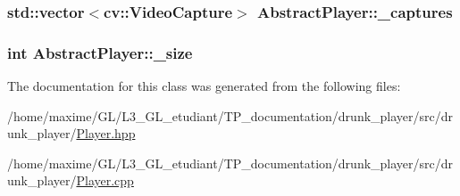 \subsubsection[{\texorpdfstring{\+\_\+captures}{_captures}}]{\setlength{\rightskip}{0pt plus 5cm}std\+::vector$<$cv\+::\+Video\+Capture$>$ Abstract\+Player\+::\+\_\+captures\hspace{0.3cm}{\ttfamily [protected]}}\hypertarget{classAbstractPlayer_a72dd2ef25310decd45671a7d51e1f319}{}\label{classAbstractPlayer_a72dd2ef25310decd45671a7d51e1f319}
\subsubsection[{\texorpdfstring{\+\_\+size}{_size}}]{\setlength{\rightskip}{0pt plus 5cm}int Abstract\+Player\+::\+\_\+size\hspace{0.3cm}{\ttfamily [protected]}}\hypertarget{classAbstractPlayer_a9d8395a141cc985622d4910209bc7d53}{}\label{classAbstractPlayer_a9d8395a141cc985622d4910209bc7d53}


The documentation for this class was generated from the following files\+:\begin{DoxyCompactItemize}
\item 
/home/maxime/\+G\+L/\+L3\+\_\+\+G\+L\+\_\+etudiant/\+T\+P\+\_\+documentation/drunk\+\_\+player/src/drunk\+\_\+player/\hyperlink{Player_8hpp}{Player.\+hpp}\item 
/home/maxime/\+G\+L/\+L3\+\_\+\+G\+L\+\_\+etudiant/\+T\+P\+\_\+documentation/drunk\+\_\+player/src/drunk\+\_\+player/\hyperlink{Player_8cpp}{Player.\+cpp}\end{DoxyCompactItemize}
